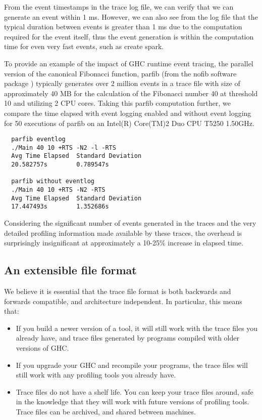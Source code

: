 \documentclass[twocolumn,9pt]{sigplanconf}
\newcommand{\codef}[1]{{\fontfamily{cmss}\small#1}}
\let\cite=\citep
\begin{document}
From the event timestamps in the trace log file, we can verify that we can 
generate an event within 1 ms.  However, we can also see from the log file that
the typical duration between events is greater than 1 ms due to the computation 
required for the event itself, thus the event generation is within
the computation time for even very fast events, such as create spark.

To provide an example of the impact of GHC runtime event tracing, the parallel 
version of the canonical Fibonacci function, \codef{parfib} (from
the \codef{nofib} software package \cite{nofib}) typically generates over 2 million
events in a trace file with size of approximately 40 MB for the
calculation of the Fibonacci number 40 at threshold 10 and utilizing 2 CPU cores.
Taking this parfib computation further, we compare the time elapsed with
event logging enabled and without event logging for 50 executions of
parfib on an Intel(R) Core(TM)2 Duo CPU T5250 1.50GHz.

\begin{verbatim}
  parfib eventlog 
  ./Main 40 10 +RTS -N2 -l -RTS
  Avg Time Elapsed  Standard Deviation
  20.582757s        0.789547s

  parfib without eventlog 
  ./Main 40 10 +RTS -N2 -RTS
  Avg Time Elapsed  Standard Deviation
  17.447493s        1.352686s
\end{verbatim}

Considering the significant number of events generated in the traces and
the very detailed profiling information made available by these traces, 
the overhead is surprisingly insignificant at approximately a 10-25\%
increase in elapsed time.

\subsection{An extensible file format}

We believe it is essential that the trace file format is both
backwards and forwards compatible, and architecture independent.  In
particular, this means that:

\begin{itemize}
\item If you build a newer version of a tool, it will still work with
  the trace files you already have, and trace files generated by
  programs compiled with older versions of GHC.

\item If you upgrade your GHC and recompile your programs, the trace
  files will still work with any profiling tools you already have.

\item Trace files do not have a shelf life.  You can keep your trace
  files around, safe in the knowledge that they will work with future
  versions of profiling tools.  Trace files can be archived, and
  shared between machines.
\end{itemize}
\end{document}
